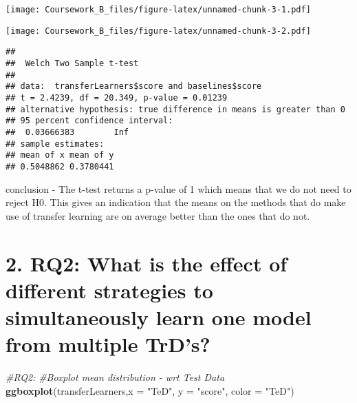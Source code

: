 \documentclass[]{article}
\newenvironment{Shaded}{\begin{snugshade}}{\end{snugshade}}
\newcommand{\KeywordTok}[1]{\textcolor[rgb]{0.13,0.29,0.53}{\textbf{#1}}}
\newcommand{\DataTypeTok}[1]{\textcolor[rgb]{0.13,0.29,0.53}{#1}}
\newcommand{\StringTok}[1]{\textcolor[rgb]{0.31,0.60,0.02}{#1}}
\newcommand{\CommentTok}[1]{\textcolor[rgb]{0.56,0.35,0.01}{\textit{#1}}}
\newcommand{\OperatorTok}[1]{\textcolor[rgb]{0.81,0.36,0.00}{\textbf{#1}}}
\newcommand{\NormalTok}[1]{#1}
\begin{document}
\texttt{[image: Coursework\_B\_files/figure-latex/unnamed-chunk-3-1.pdf]}

\begin{Shaded}
\end{Shaded}

\texttt{[image: Coursework\_B\_files/figure-latex/unnamed-chunk-3-2.pdf]}

\begin{Shaded}
\end{Shaded}

\begin{verbatim}
## 
##  Welch Two Sample t-test
## 
## data:  transferLearners$score and baselines$score
## t = 2.4239, df = 20.349, p-value = 0.01239
## alternative hypothesis: true difference in means is greater than 0
## 95 percent confidence interval:
##  0.03666383        Inf
## sample estimates:
## mean of x mean of y 
## 0.5048862 0.3780441
\end{verbatim}

conclusion - The t-test returns a p-value of 1 which means that we do
not need to reject H0. This gives an indication that the means on the
methods that do make use of transfer learning are on average better than
the ones that do not.

\section{2. RQ2: What is the effect of different strategies to
simultaneously learn one model from multiple
TrD's?}\label{rq2-what-is-the-effect-of-different-strategies-to-simultaneously-learn-one-model-from-multiple-trds}

\begin{Shaded}
\begin{Highlighting}[]
\CommentTok{#RQ2:}
\CommentTok{#Boxplot mean distribution - wrt Test Data}
\KeywordTok{ggboxplot}\NormalTok{(transferLearners,}\DataTypeTok{x =} \StringTok{"TeD"}\NormalTok{, }\DataTypeTok{y =} \StringTok{"score"}\NormalTok{, }\DataTypeTok{color =} \StringTok{"TeD"}\NormalTok{)}
\end{Highlighting}
\end{Shaded}
\end{document}
